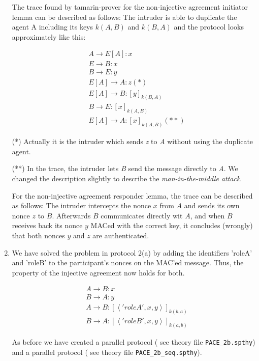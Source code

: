 \documentclass[a4paper,11pt]{scrartcl}
\newcommand{\tuple}[1]{\left\langle #1\right\rangle}
\begin{document}
\begin{enumerate}[label=\alph*)]
The trace found by tamarin-prover for the non-injective agreement initiator lemma can be described as follows: The intruder is able to duplicate the agent A including its keys $k(A,B)$ and $k(B,A)$ and the protocol looks approximately like this:

\begin{align*}
&A \rightarrow E[A]: x\\
&E \rightarrow B: x\\
&B \rightarrow E: y\\
&E[A] \rightarrow A: z (*)\\
&E[A] \rightarrow B: [y]_{k(B,A)}\\
&B \rightarrow E: [x]_{k(A,B)}\\
&E[A]\rightarrow A: [x]_{k(A,B)} (**)
\end{align*}

(*) Actually it is the intruder which sends \emph{z} to \emph{A} without using the duplicate agent.

(**) In the trace, the intruder lets \emph{B} send the message directly to \emph{A}. We changed the description slightly to describe the \textit{man-in-the-middle attack}.

For the non-injective agreement responder lemma, the trace can be described as follows: The intruder intercepts the nonce $x$ from $A$ and sends its own nonce $z$ to $B$. Afterwards $B$ communicates directly wit $A$, and when $B$ receives back its nonce $y$ MACed with the correct key, it concludes (wrongly) that both nonces $y$ and $z$ are authenticated.

\item We have solved the problem in protocol 2(a) by adding the identifiers 'roleA' and 'roleB' to the participant's nonces on the MAC'ed message.  Thus, the property of the injective agreement now holds for both.

\begin{align*}
&A \rightarrow B: x\\
&B \rightarrow A: y\\
&A \rightarrow B: [\tuple{'roleA', x, y}]_{k(b,a)}\\
&B \rightarrow A: [\tuple{'roleB', x, y}]_{k(a,b)}
\end{align*}

As before we have created a parallel protocol ( see theory file \texttt{PACE\_2b.spthy}) and a parallel protocol ( see theory file \texttt{PACE\_2b\_seq.spthy}).
\end{enumerate}
\end{document}
